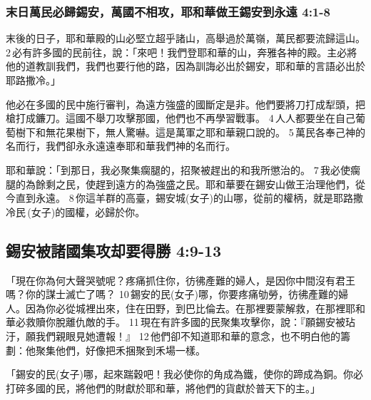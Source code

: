 \subsubsection{末日萬民必歸錫安，萬國不相攻，耶和華做王錫安到永遠 4:1-8}
末後的日子，耶和華殿的山必堅立超乎諸山，高舉過於萬嶺，萬民都要流歸這山。 2 必有許多國的民前往，說：「來吧！我們登耶和華的山，奔雅各神的殿。主必將他的道教訓我們，我們也要行他的路，因為訓誨必出於錫安，耶和華的言語必出於耶路撒冷。」


他必在多國的民中施行審判，為遠方強盛的國斷定是非。他們要將刀打成犁頭，把槍打成鐮刀。這國不舉刀攻擊那國，他們也不再學習戰事。 4 人人都要坐在自己葡萄樹下和無花果樹下，無人驚嚇。這是萬軍之耶和華親口說的。 5 萬民各奉己神的名而行，我們卻永永遠遠奉耶和華我們神的名而行。


耶和華說：「到那日，我必聚集瘸腿的，招聚被趕出的和我所懲治的。 7 我必使瘸腿的為餘剩之民，使趕到遠方的為強盛之民。耶和華要在錫安山做王治理他們，從今直到永遠。 8 你這羊群的高臺，錫安城(女子)的山哪，從前的權柄，就是耶路撒冷民 (女子)的國權，必歸於你。


\subsection{錫安被諸國集攻却要得勝 4:9-13}
 「現在你為何大聲哭號呢？疼痛抓住你，彷彿產難的婦人，是因你中間沒有君王嗎？你的謀士滅亡了嗎？ 10 錫安的民(女子)哪，你要疼痛劬勞，彷彿產難的婦人。因為你必從城裡出來，住在田野，到巴比倫去。在那裡要蒙解救，在那裡耶和華必救贖你脫離仇敵的手。 11 現在有許多國的民聚集攻擊你，說：『願錫安被玷汙，願我們親眼見她遭報！』 12 他們卻不知道耶和華的意念，也不明白他的籌劃：他聚集他們，好像把禾捆聚到禾場一樣。

「錫安的民(女子)哪，起來踹穀吧！我必使你的角成為鐵，使你的蹄成為銅。你必打碎多國的民，將他們的財獻於耶和華，將他們的貨獻於普天下的主。」


